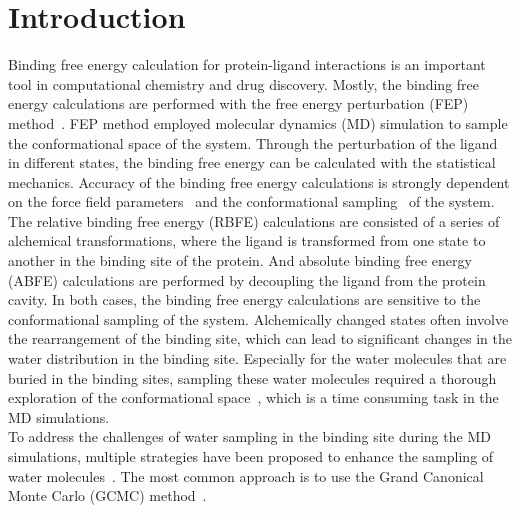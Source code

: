 \documentclass[journal=jacsat,manuscript=article]{achemso}
\begin{document}
\section{Introduction}
Binding free energy calculation for protein-ligand interactions is an important tool in computational chemistry and drug discovery.
Mostly, the binding free energy calculations are performed with the free energy perturbation (FEP) method~\cite{jiang2010free, wang2019protein, Qian2024}.
FEP method employed molecular dynamics (MD) simulation to sample the conformational space of the system.
Through the perturbation of the ligand in different states, the binding free energy can be calculated with the statistical mechanics.
Accuracy of the binding free energy calculations is strongly dependent on the force field parameters~\cite{Ding2023, 17c36m, lu2021opls4, he2022recent, vanommeslaeghe2012automationI, vanommeslaeghe2012automationII} 
and the conformational sampling~\cite{15rex, wang2011replica, hritz2008hamiltonian} of the system.\\
\newline
The relative binding free energy (RBFE) calculations are consisted of a series of alchemical transformations, 
where the ligand is transformed from one state to another in the binding site of the protein.
And absolute binding free energy (ABFE) calculations are performed by decoupling the ligand from the protein cavity.
In both cases, the binding free energy calculations are sensitive to the conformational sampling of the system.
Alchemically changed states often involve the rearrangement of the binding site, 
which can lead to significant changes in the water distribution in the binding site.
Especially for the water molecules that are buried in the binding sites,
sampling these water molecules required a thorough exploration of the conformational space~\cite{zhou2009theory, cozzini2004free,li2007water}, 
which is a time consuming task in the MD simulations. \\
\newline
To address the challenges of water sampling in the binding site during the MD simulations,
multiple strategies have been proposed to enhance the sampling of water molecules~\cite{Wagle2024,ross2020enhancing,Ge2022,ben2021fast,Deng2024,Liu2025}.
The most common approach is to use the Grand Canonical Monte Carlo (GCMC) method~\cite{ross2015water, ross2020enhancing, Aldeghi2018, Bodnarchuk2014, deng2008computation, Samways2020, Woo2004}.
\end{document}
